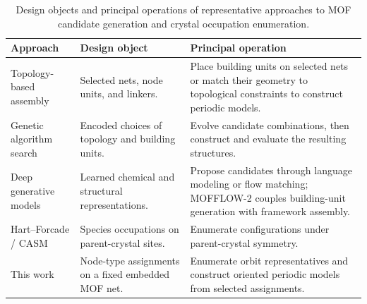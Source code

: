 \documentclass[a5paper, 10pt]{article}
\begin{document}
\begin{table}[htbp]
\centering
\small
\singlespacing
\setlength{\tabcolsep}{5pt}
\renewcommand{\arraystretch}{1.08}
\captionsetup{margin=0pt,skip=6pt}
\caption{Design objects and principal operations of representative approaches to MOF candidate generation and crystal occupation enumeration.}
\label{tab:related_capabilities}
\begin{tabular}{@{}
    >{\raggedright\arraybackslash}p{}
    >{\raggedright\arraybackslash}p{}
    >{\raggedright\arraybackslash}p{}@{}}
\toprule
\textbf{Approach} & \textbf{Design object} & \textbf{Principal operation} \\
\midrule
Topology-based assembly & Selected nets, node units, and linkers. & Place building units on selected nets or match their geometry to topological constraints to construct periodic models. \\
\addlinespace[4pt]
Genetic algorithm search & Encoded choices of topology and building units. & Evolve candidate combinations, then construct and evaluate the resulting structures. \\
\addlinespace[4pt]
Deep generative models & Learned chemical and structural representations. & Propose candidates through language modeling or flow matching; MOFFLOW-2 couples building-unit generation with framework assembly. \\
\addlinespace[4pt]
Hart--Forcade / CASM & Species occupations on parent-crystal sites. & Enumerate configurations under parent-crystal symmetry. \\
\addlinespace[4pt]
This work & Node-type assignments on a fixed embedded MOF net. & Enumerate orbit representatives and construct oriented periodic models from selected assignments. \\
\bottomrule
\end{tabular}

\end{table}
\end{document}

